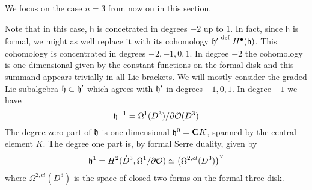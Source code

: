 \documentclass[11pt]{amsart}
\begin{document}
We focus on the case $n=3$ from now on in this section.

Note that in this case, $\mathsf{h}$ is concetrated in degrees $-2$ up to $1$.
In fact, since $\mathsf{h}$ is formal, we might as well replace it with its cohomology $\mathfrak{h}' \overset{\rm def}{=} H^{\bullet}(\mathsf{h})$.
This cohomology is concentrated in degrees $-2,-1,0,1$.
In degree $-2$ the cohomology is one-dimensional given by the constant functions on the formal disk and this summand appears trivially in all Lie brackets.
We will mostly consider the graded Lie subalgebra $\mathfrak{h} \subset \mathfrak{h}'$ which agrees with $\mathfrak{h}'$ in degrees $-1,0,1$.
In degree $-1$ we have
\begin{equation}\label{eqn:deg-1}
\mathfrak{h}^{-1} = \Omega^{1} (D^{3}) \slash \partial \mathcal O(D^{3})
\end{equation}
The degree zero part of $\mathfrak{h}$ is one-dimensional $\mathfrak{h}^{0} = \mathbf{C} K$, spanned by the central element $K$.
The degree one part is, by formal Serre duality, given by
\begin{equation}\label{eqn:formalserre}
  \mathfrak{h}^{1} = H^{2}(\mathring{D}^{3}, \Omega^{1} \slash \partial \mathcal O) \simeq \left(\Omega^{2,cl}(D^{3})\right)^{\vee}
\end{equation}
where $\Omega^{2,cl}(D^{3})$ is the space of closed two-forms on the formal three-disk.
\end{document}

